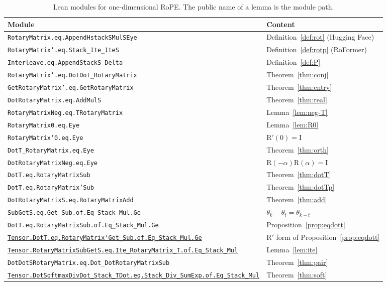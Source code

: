 \documentclass[11pt,a4paper]{article}
\newcommand{\lmod}[1]{\href{http://www.lemma.cn/lean/?module=#1}{\nolinkurl{#1}}}
\newcommand{\rot}{\mathrm{R}}
\newcommand{\eye}{\mathrm{I}}
\begin{document}
\begin{table}[t]
\centering
\caption{Lean modules for one-dimensional RoPE.
The public name of a lemma is the module path.}
\label{tab:mods}
\small
\begin{tabular}{p{}p{}}
\hline
Module & Content \\
\hline
\texttt{RotaryMatrix.eq.AppendHstackSMulSEye} & Definition~\ref{def:rot} (Hugging Face) \\
\texttt{RotaryMatrix'.eq.Stack\_Ite\_IteS} & Definition~\ref{def:rotp} (RoFormer) \\
\texttt{Interleave.eq.AppendStackS\_Delta} & Definition~\ref{def:P} \\
\texttt{RotaryMatrix'.eq.DotDot\_RotaryMatrix} & Theorem~\ref{thm:conj} \\
\texttt{GetRotaryMatrix'.eq.GetRotaryMatrix} & Theorem~\ref{thm:entry} \\
\texttt{DotRotaryMatrix.eq.AddMulS} & Theorem~\ref{thm:real} \\
\texttt{RotaryMatrixNeg.eq.TRotaryMatrix} & Lemma~\ref{lem:neg-T} \\
\texttt{RotaryMatrix0.eq.Eye} & Lemma~\ref{lem:R0} \\
\texttt{RotaryMatrix'0.eq.Eye} & \(\rot'(0)=\eye\) \\
\texttt{DotT\_RotaryMatrix.eq.Eye} & Theorem~\ref{thm:orth} \\
\texttt{DotRotaryMatrixNeg.eq.Eye} & \(\rot(-\alpha)\rot(\alpha)=\eye\) \\
\texttt{DotT.eq.RotaryMatrixSub} & Theorem~\ref{thm:dotT} \\
\texttt{DotT.eq.RotaryMatrix'Sub} & Theorem~\ref{thm:dotTp} \\
\texttt{DotRotaryMatrixS.eq.RotaryMatrixAdd} & Theorem~\ref{thm:add} \\
\texttt{SubGetS.eq.Get\_Sub.of.Eq\_Stack\_Mul.Ge} & \(\theta_k-\theta_t=\theta_{k-t}\) \\
\texttt{DotT.eq.RotaryMatrixSub.of.Eq\_Stack\_Mul.Ge} & Proposition~\ref{prop:eqdott} \\
{\footnotesize\lmod{Tensor.DotT.eq.RotaryMatrix'Get_Sub.of.Eq_Stack_Mul.Ge}} & \(\rot'\) form of Proposition~\ref{prop:eqdott} \\
{\footnotesize\lmod{Tensor.RotaryMatrixSubGetS.eq.Ite_RotaryMatrix_T.of.Eq_Stack_Mul}} & Lemma~\ref{lem:ite} \\
\texttt{DotDotSRotaryMatrix.eq.Dot\_DotRotaryMatrixSub} & Theorem~\ref{thm:pair} \\
{\footnotesize\lmod{Tensor.DotSoftmaxDivDot_Stack_TDot.eq.Stack_Div_SumExp.of.Eq_Stack_Mul}} & Theorem~\ref{thm:soft} \\
\hline
\end{tabular}
\end{table}
\end{document}
